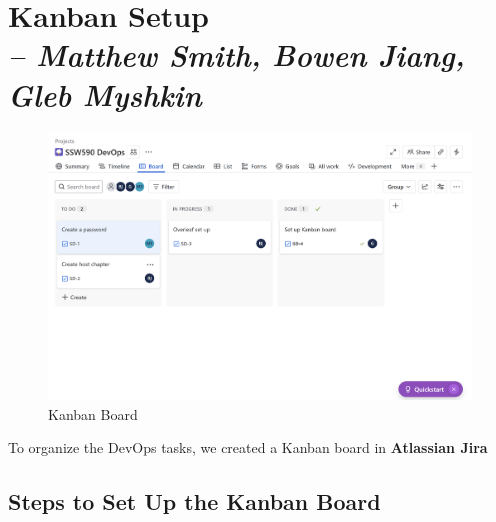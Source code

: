 \chapter{Kanban Setup \\
\small{\textit{-- Matthew Smith, Bowen Jiang, Gleb Myshkin}}
\label{Chapter::Kanban Setup1}}

\begin{figure} [H]
\includegraphics[width=\textwidth]{Kanban Board.png}
  \centering
  \caption{Kanban Board}
  \vspace{-0.3cm}
\end{figure}


\newpage
To organize the DevOps tasks, we created a Kanban board in \textbf{Atlassian Jira}

\section{Steps to Set Up the Kanban Board}

